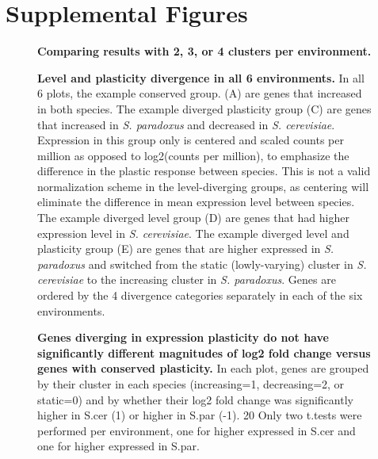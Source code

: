 \clearpage
\section{Supplemental Figures}
\setcounter{figure}{0}

\begin{figure}[H]
    \centering
    \caption{\textbf{Comparing results with 2, 3, or 4 clusters per environment.}}
    \label{fig:qc_clusters}
\end{figure}

\begin{figure}
    \centering
    \label{fig:all_environments}
\end{figure}

\begin{figure}
    \centering
    \caption{\textbf{Level and plasticity divergence in all 6 environments. }In all 6 plots, the example conserved group. (A) are genes that increased in both species. The example diverged plasticity group (C) are genes that increased in \textit{S. paradoxus} and decreased in \textit{S. cerevisiae}. Expression in this group only is centered and scaled counts per million as opposed to log2(counts per million), to emphasize the difference in the plastic response between species. This is not a valid normalization scheme in the level-diverging groups, as centering will eliminate the difference in mean expression level between species. The example diverged level group (D) are genes that had higher expression level in \textit{S. cerevisiae}. The example diverged level and plasticity group (E) are genes that are higher expressed in \textit{S. paradoxus} and switched from the static (lowly-varying) cluster in \textit{S. cerevisiae} to the increasing cluster in \textit{S. paradoxus}. Genes are ordered by the 4 divergence categories separately in each of the six environments.}
    \label{fig:all_environments}
\end{figure}

\begin{figure}
    \centering
    \caption{\textbf{Genes diverging in expression plasticity do not have significantly different magnitudes of log2 fold change versus genes with conserved plasticity.} In each plot, genes are grouped by their cluster in each species (increasing=1, decreasing=2, or static=0) and by whether their log2 fold change was significantly higher in S.cer (1) or higher in S.par (-1). 20
Only two t.tests were performed per environment, one for higher expressed in S.cer and one for higher expressed in S.par.}
    \label{fig:boxplots}
\end{figure}

